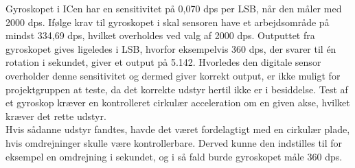 Gyroskopet i ICen har en sensitivitet på 0,070 dps per LSB, når den måler med 2000 dps. Ifølge krav til gyroskopet i  skal sensoren have et arbejdsområde på mindst 334,69 dps, hvilket overholdes ved valg af 2000 dps. Outputtet fra gyroskopet gives ligeledes i LSB, hvorfor eksempelvis 360 dps, der svarer til én rotation i sekundet, giver et output på 5.142. Hvorledes den digitale sensor overholder denne sensitivitet og dermed giver korrekt output, er ikke muligt for projektgruppen at teste, da det korrekte udstyr hertil ikke er i besiddelse. Test af et gyroskop kræver en kontrolleret cirkulær acceleration om en given akse, hvilket kræver det rette udstyr.\\
Hvis sådanne udstyr fandtes, havde det været fordelagtigt med en cirkulær plade, hvis omdrejninger skulle være kontrollerbare. Derved kunne den indstilles til for eksempel en omdrejning i sekundet, og i så fald burde gyroskopet måle 360 dps.
%
%
%

